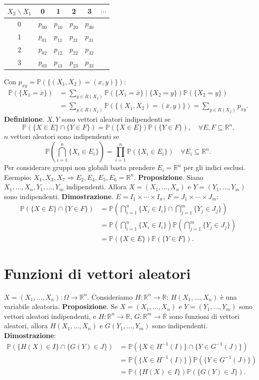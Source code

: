 \documentclass[11pt,a4paper]{article}
\newcommand{\pagina}[1]{\clearpage}
\begin{document}
\begin{center}\begin{tabular}{c|ccccc}$X_2\backslash X_1$&0&1&2&3&$\cdots$\\\hline
0&$p_{00}$&$p_{10}$&$p_{20}$&$p_{30}$&\\
1&$p_{01}$&$p_{11}$&$p_{21}$&$p_{31}$&\\
2&$p_{02}$&$p_{12}$&$p_{22}$&$p_{32}$&\\
3&$p_{03}$&$p_{13}$&$p_{23}$&$p_{33}$&
\end{tabular}\end{center}
Con $p_{xy}=\mathbb P(\{(X_1,X_2)=(x,y)\})$:
\begin{align*}
\mathbb P(\{X_1=\bar x\})&=\sum_{y\in R(X_2)}\mathbb P(\{X_1=\bar x\}\mid\{X_2=y\})\mathbb P(\{X_2=y\})\\
&=\sum_{y\in R(X_2)}\mathbb P(\{(X_1,X_2)=(\bar x,y)\})=\sum_{y\in R(X_2)}p_{\bar xy}.
\end{align*}
\textbf{Definizione}. $X,Y$ sono vettori aleatori indipendenti se
\[\mathbb P(\{X\in E\}\cap\{Y\in F\})=\mathbb P(\{X\in E\})\mathbb P(\{Y\in F\}),\quad\forall E,F\subseteq\mathbb R^n.\]
$n$ vettori aleatori sono indipendenti se
\[\mathbb P\left(\bigcap_{i=1}^n\{X_i\in E_i\}\right)=\prod_{i=1}^n\mathbb P(\{X_i\in E_i\})\quad\forall E_i\subseteq\mathbb R^n.\]
Per considerare gruppi non globali basta prendere $E_i=\mathbb R^n$ per gli indici esclusi. Esempio: $X_1,X_3,X_7\Rightarrow E_2,E_4,E_5,E_6=\mathbb R^n$.
\pagina{23}\textbf{Proposizione}. Siano $X_1,\ldots,X_n,Y_1,\ldots,Y_m$ indipendenti. Allora $X=(X_1,\ldots,X_n)$ e $Y=(Y_1,\ldots,Y_m)$ sono indipendenti.
\textbf{Dimostrazione}. $E=I_1\times\cdots\times I_n$, $F=J_1\times\cdots\times J_m$:
\begin{align*}
\mathbb P(\{X\in E\}\cap\{Y\in F\})&=\mathbb P\left(\bigcap_{i=1}^n\{X_i\in I_i\}\cap\bigcap_{j=1}^m\{Y_j\in J_j\}\right)\\
&=\mathbb P\left(\bigcap_{i=1}^n\{X_i\in I_i\}\right)\mathbb P\left(\bigcap_{j=1}^m\{Y_j\in J_j\}\right)\\
&=\mathbb P(\{X\in E\})\mathbb P(\{Y\in F\}).
\end{align*}
\section*{Funzioni di vettori aleatori}
$X=(X_1,\ldots,X_n):\Omega\to\mathbb R^n$. Consideriamo $H:\mathbb R^n\to\mathbb R$: $H(X_1,\ldots,X_n)$ è una variabile aleatoria.
\textbf{Proposizione}. Se $X=(X_1,\ldots,X_n)$ e $Y=(Y_1,\ldots,Y_m)$ sono vettori aleatori indipendenti, e $H:\mathbb R^n\to\mathbb R$, $G:\mathbb R^m\to\mathbb R$ sono funzioni di vettori aleatori, allora $H(X_1,\ldots,X_n)$ e $G(Y_1,\ldots,Y_m)$ sono indipendenti.
\textbf{Dimostrazione}:
\begin{align*}
\mathbb P(\{H(X)\in I\}\cap\{G(Y)\in J\})&=\mathbb P(\{X\in H^{-1}(I)\}\cap\{Y\in G^{-1}(J)\})\\
&=\mathbb P(\{X\in H^{-1}(I)\})\mathbb P(\{Y\in G^{-1}(J)\})\\
&=\mathbb P(\{H(X)\in I\})\mathbb P(\{G(Y)\in J\}).
\end{align*}
\end{document}
